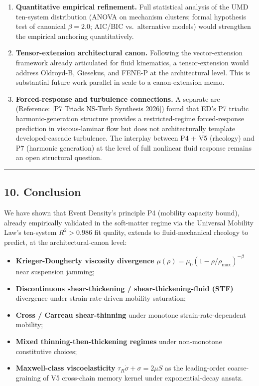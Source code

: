 \documentclass[
  11pt,a4paper]{article}
\providecommand{\tightlist}{%
  \setlength{\itemsep}{0pt}\setlength{\parskip}{0pt}}
\begin{document}
\begin{enumerate}
\def\labelenumi{\arabic{enumi}.}
\item
  \textbf{Quantitative empirical refinement.} Full statistical analysis
  of the UMD ten-system distribution (ANOVA on mechanism clusters;
  formal hypothesis test of canonical \(\beta = 2.0\); AIC/BIC
  vs.~alternative models) would strengthen the empirical anchoring
  quantitatively.
\item
  \textbf{Tensor-extension architectural canon.} Following the
  vector-extension framework already articulated for fluid kinematics, a
  tensor-extension would address Oldroyd-B, Giesekus, and FENE-P at the
  architectural level. This is substantial future work parallel in scale
  to a canon-extension memo.
\item
  \textbf{Forced-response and turbulence connections.} A separate arc
  (Reference: {[}P7 Triads NS-Turb Synthesis 2026{]}) found that ED's P7
  triadic harmonic-generation structure provides a restricted-regime
  forced-response prediction in viscous-laminar flow but does not
  architecturally template developed-cascade turbulence. The interplay
  between P4 + V5 (rheology) and P7 (harmonic generation) at the level
  of full nonlinear fluid response remains an open structural question.
\end{enumerate}

\begin{center}\rule{0.5\linewidth}{0.5pt}\end{center}

\subsection{10. Conclusion}\label{conclusion}

We have shown that Event Density's principle P4 (mobility capacity
bound), already empirically validated in the soft-matter regime via the
Universal Mobility Law's ten-system \(R^2 > 0.986\) fit quality, extends
to fluid-mechanical rheology to predict, at the architectural-canon
level:

\begin{itemize}
\tightlist
\item
  \textbf{Krieger-Dougherty viscosity divergence}
  \(\mu(\rho) = \mu_0 (1 - \rho/\rho_\mathrm{max})^{-\beta}\) near
  suspension jamming;
\item
  \textbf{Discontinuous shear-thickening / shear-thickening-fluid (STF)}
  divergence under strain-rate-driven mobility saturation;
\item
  \textbf{Cross / Carreau shear-thinning} under monotone
  strain-rate-dependent mobility;
\item
  \textbf{Mixed thinning-then-thickening regimes} under non-monotone
  constitutive choices;
\item
  \textbf{Maxwell-class viscoelasticity}
  \(\tau_R \dot\sigma + \sigma = 2\mu S\) as the leading-order
  coarse-graining of V5 cross-chain memory kernel under
  exponential-decay ansatz.
\end{itemize}
\end{document}
